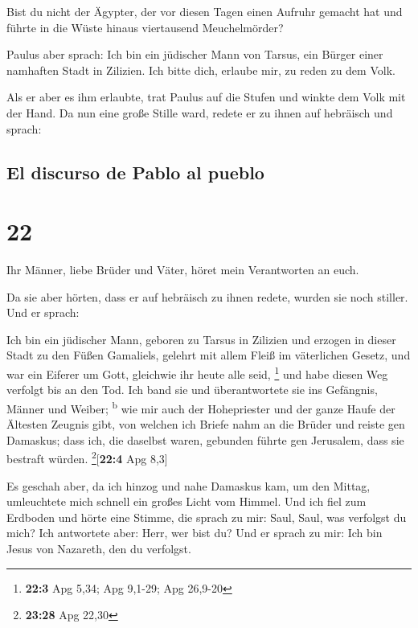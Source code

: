  Bist du nicht der Ägypter, der vor diesen Tagen einen
Aufruhr gemacht hat und führte in die Wüste hinaus viertausend
Meuchelmörder?

 Paulus aber sprach: Ich bin ein jüdischer Mann von
Tarsus, ein Bürger einer namhaften Stadt in Zilizien. Ich bitte dich,
erlaube mir, zu reden zu dem Volk.

 Als er aber es ihm erlaubte, trat Paulus auf die Stufen
und winkte dem Volk mit der Hand. Da nun eine große Stille ward, redete
er zu ihnen auf hebräisch und sprach:

\hypertarget{el-discurso-de-pablo-al-pueblo}{%
\subsection{El discurso de Pablo al
pueblo}\label{el-discurso-de-pablo-al-pueblo}}

\hypertarget{section-21}{%
\section{22}\label{section-21}}

 Ihr Männer, liebe Brüder und Väter, höret mein
Verantworten an euch.

 Da sie aber hörten, dass er auf hebräisch zu ihnen
redete, wurden sie noch stiller. Und er sprach:

 Ich bin ein jüdischer Mann, geboren zu Tarsus in Zilizien
und erzogen in dieser Stadt zu den Füßen Gamaliels, gelehrt mit allem
Fleiß im väterlichen Gesetz, und war ein Eiferer um Gott, gleichwie ihr
heute alle seid, \footnote{\textbf{22:3} Apg 5,34; Apg 9,1-29; Apg
  26,9-20}  und habe diesen Weg verfolgt bis an den Tod.
Ich band sie und überantwortete sie ins Gefängnis, Männer und Weiber;
\textsuperscript{b}  wie mir auch der Hohepriester und der
ganze Haufe der Ältesten Zeugnis gibt, von welchen ich Briefe nahm an
die Brüder und reiste gen Damaskus; dass ich, die daselbst waren,
gebunden führte gen Jerusalem, dass sie bestraft würden.
\footnote{\textbf{23:28} Apg 22,30}{[}\textbf{22:4} Apg 8,3{]}

 Es geschah aber, da ich hinzog und nahe Damaskus kam, um
den Mittag, umleuchtete mich schnell ein großes Licht vom Himmel.
 Und ich fiel zum Erdboden und hörte eine Stimme, die
sprach zu mir: Saul, Saul, was verfolgst du mich?  Ich
antwortete aber: Herr, wer bist du? Und er sprach zu mir: Ich bin Jesus
von Nazareth, den du verfolgst.

